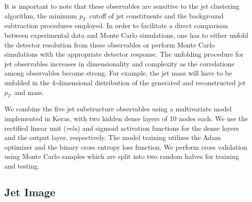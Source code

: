 \documentclass[notoc]{JHEP3}
\newcommand{\pt}{$p_{T}$}
\newcommand{\jw}{\textsc{Jewel}~}
\begin{document}
It is important to note that these observables are sensitive to the jet clustering algorithm, the minimum \pt ~cutoff of jet constituents and the background subtraction procedures employed. In order to facilitate a direct comparison between experimental data and Monte Carlo simulations, one has to either unfold the detector resolution from these observables or perform Monte Carlo simulations with the appropriate detector response. The unfolding procedure for jet observables increases in dimensionality and complexity as the correlations among observables become strong. For example, the jet mass will have to be unfolded in the 4-dimensional distribution of the generated and reconstructed jet \pt ~and mass.

We combine the five jet substructure observables using a multivariate model implemented in Keras, with two hidden dense layers of 10 nodes each. We use the rectified linear unit (\textit{relu}) and sigmoid activation functions for the dense layers and the output layer, respectively. The model training utilizes the Adam optimizer and the binary cross entropy loss function. We perform cross validation using Monte Carlo samples which are split into two random halves for training and testing.


\subsection{Jet Image}
\label{sec:image}
\end{document}
